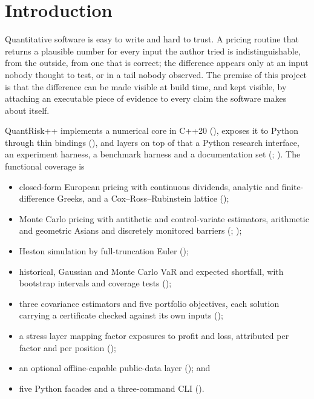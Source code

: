 \documentclass[11pt,a4paper]{article}
\begin{document}
\tableofcontents
\newpage

\section{Introduction}
\label{sec:introduction}

Quantitative software is easy to write and hard to trust. A pricing routine that returns a
plausible number for every input the author tried is indistinguishable, from the outside,
from one that is correct; the difference appears only at an input nobody thought to test, or
in a tail nobody observed. The premise of this project is that the difference can be made
visible at build time, and kept visible, by attaching an executable piece of evidence to
every claim the software makes about itself.

QuantRisk++ implements a numerical core in C++20 (), exposes it to Python
through thin bindings (), and layers on top of that a
Python research interface, an experiment harness, a benchmark harness and a documentation
set (; ). The functional coverage is
\begin{itemize}
\item closed-form European pricing with continuous dividends, analytic and finite-difference
      Greeks, and a Cox--Ross--Rubinstein lattice
      ();
\item Monte Carlo pricing with antithetic and control-variate estimators, arithmetic and
      geometric Asians and discretely monitored barriers
      (;
      );
\item Heston simulation by full-truncation Euler ();
\item historical, Gaussian and Monte Carlo VaR and expected shortfall, with bootstrap intervals
      and coverage tests ();
\item three covariance estimators and five portfolio objectives, each solution carrying a
      certificate checked against its own inputs
      ();
\item a stress layer mapping factor exposures to profit and loss, attributed per factor and per
      position ();
\item an optional offline-capable public-data layer
      (); and
\item five Python facades and a three-command CLI
      ().
\end{itemize}
\end{document}
